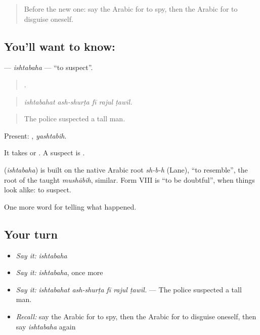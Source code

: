 \label{lesson:AR-C346-ishtabaha}



\begin{quote}
Before the new one: say the Arabic for to spy, then the Arabic for to disguise oneself.
\end{quote}

\subsection*{You'll want to know: }
\textbf{} — \emph{ishtabaha} — \textquotedblleft{}to suspect\textquotedblright{}.

\begin{quote}
    .
\end{quote}

\begin{quote}
\emph{ishtabahat ash-shurṭa fī rajul ṭawīl.}
\end{quote}

\begin{quote}
The police suspected a tall man.
\end{quote}

Present: , \emph{yashtabih}.

It takes  or . A suspect is  .

\begin{cousinweb}
\textbf{} (\emph{ishtabaha}) is built on the native Arabic root \emph{sh-b-h} (Lane), \textquotedblleft{}to resemble\textquotedblright{}, the root of the taught \emph{mushābih}, similar. Form VIII is \textquotedblleft{}to be doubtful\textquotedblright{}, when things look alike: to suspect.
\end{cousinweb}

\begin{grammarlens}[title={What you've built}]
One more word for telling what happened.
\end{grammarlens}

\subsection*{Your turn}
\begin{itemize}
\raggedright
  \item \emph{Say it:} \emph{ishtabaha}
  \item \emph{Say it:} \emph{ishtabaha}, once more
  \item \emph{Say it:} \emph{ishtabahat ash-shurṭa fī rajul ṭawīl.} — The police suspected a tall man.
  \item \emph{Recall:} say the Arabic for to spy, then the Arabic for to disguise oneself, then say \emph{ishtabaha} again
\end{itemize}

